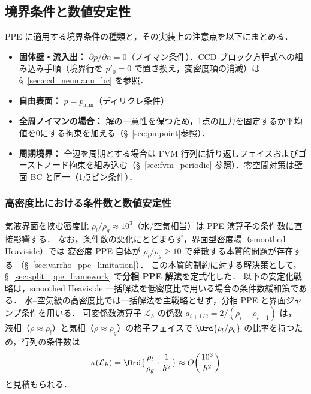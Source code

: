 %
%
\subsection{境界条件と数値安定性}
\label{sec:ppe_bc_stability}

PPE に適用する境界条件の種類と，その実装上の注意点を以下にまとめる．
\begin{itemize}
    \item \textbf{固体壁・流入出：} $\partial p/\partial n = 0$（ノイマン条件）．CCD ブロック方程式への組み込み手順（境界行を $p'_0=0$ で置き換え，変密度項の消滅）は §~\ref{sec:ccd_neumann_bc} を参照．
    \item \textbf{自由表面：} $p = p_{\mathrm{atm}}$（ディリクレ条件）
    \item \textbf{全周ノイマンの場合：} 解の一意性を保つため，1点の圧力を固定するか平均値を0にする拘束を加える（§~\ref{sec:pinpoint}参照）．
    \item \textbf{周期境界：} 全辺を周期とする場合は FVM 行列に折り返しフェイスおよびゴーストノード拘束を組み込む（§~\ref{sec:fvm_periodic} 参照）．零空間対策は壁面 BC と同一（1点ピン条件）．
\end{itemize}


\subsubsection{高密度比における条件数と数値安定性}
\label{sec:ppe_condition_number}

気液界面を挟む密度比 $\rho_l/\rho_g \approx 10^3$（水/空気相当）は
PPE 演算子の条件数に直接影響する．
なお，条件数の悪化にとどまらず，界面型密度場（smoothed Heaviside）では
変密度 PPE 自体が $\rho_l/\rho_g \geq 10$ で発散する本質的問題が存在する
（§~\ref{sec:varrho_ppe_limitation}）．
この本質的制約に対する解決策として，§~\ref{sec:split_ppe_framework} で\textbf{分相 PPE 解法}を定式化した．
以下の安定化戦略は，smoothed Heaviside 一括解法を低密度比で用いる場合の条件数緩和策である．
水--空気級の高密度比では一括解法を主戦略とせず，分相 PPE と界面ジャンプ条件を用いる．
可変係数演算子 $\mathcal{L}_h$ の係数 $a_{i+1/2} = 2/(\rho_i+\rho_{i+1})$ は，
液相（$\rho \approx \rho_l$）と気相（$\rho \approx \rho_g$）の格子フェイスで
$\Ord{\rho_l/\rho_g}$ の比率を持つため，行列の条件数は
\begin{equation}
  \kappa(\mathcal{L}_h) = \Ord{\frac{\rho_l}{\rho_g}\cdot\frac{1}{h^2}}
  \approx O\!\left(\frac{10^3}{h^2}\right)
  \label{eq:ppe_cond_number}
\end{equation}
と見積もられる．

